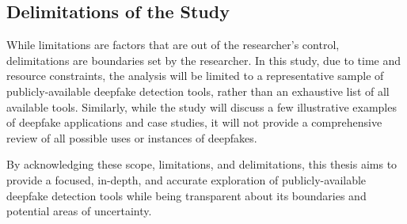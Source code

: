 \subsection{Delimitations of the Study}
While limitations are factors that are out of the researcher's control, delimitations 
are boundaries set by the researcher. In this study, due to time and resource constraints, 
the analysis will be limited to a representative sample of publicly-available deepfake 
detection tools, rather than an exhaustive list of all available tools. Similarly, while 
the study will discuss a few illustrative examples of deepfake applications and case 
studies, it will not provide a comprehensive review of all possible uses or instances 
of deepfakes.

By acknowledging these scope, limitations, and delimitations, this thesis aims to 
provide a focused, in-depth, and accurate exploration of publicly-available deepfake 
detection tools while being transparent about its boundaries and potential areas of 
uncertainty.
